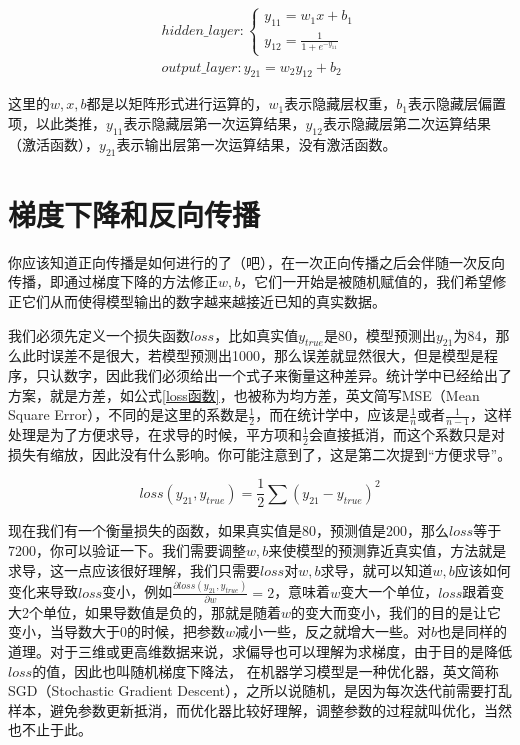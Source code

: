 \documentclass[a5paper, 11pt, openany]{book}
\begin{document}
\begin{equation}\label{forward}
    \begin{aligned}
        hidden\_layer: 
        \begin{cases}
            y_{11} = w_1x+b_1 \\
            y_{12} = \frac{1}{1+e^{-y_{11}}}
        \end{cases}\\
        output\_layer:
            y_{21} = w_2y_{12} + b_2
    \end{aligned}
\end{equation}

这里的$w, x, b$都是以矩阵形式进行运算的，$w_1$表示隐藏层权重，$b_1$表示隐藏层偏置项，以此类推，$y_{11}$表示隐藏层第一次运算结果，$y_{12}$表示隐藏层第二次运算结果（激活函数），$y_{21}$表示输出层第一次运算结果，没有激活函数。

\section{梯度下降和反向传播}

你应该知道正向传播是如何进行的了（吧），在一次正向传播之后会伴随一次反向传播，即通过梯度下降的方法修正$w, b$，它们一开始是被随机赋值的，我们希望修正它们从而使得模型输出的数字越来越接近已知的真实数据。

我们必须先定义一个损失函数$loss$，比如真实值$y_{true}$是80，模型预测出$y_{21}$为84，那么此时误差不是很大，若模型预测出1000，那么误差就显然很大，但是模型是程序，只认数字，因此我们必须给出一个式子来衡量这种差异。统计学中已经给出了方案，就是方差，如公式\ref{loss函数}，也被称为均方差，英文简写MSE（Mean Square Error），不同的是这里的系数是$\frac{1}{2}$，而在统计学中，应该是$\frac{1}{n}$或者$\frac{1}{n-1}$，这样处理是为了方便求导，在求导的时候，平方项和$\frac{1}{2}$会直接抵消，而这个系数只是对损失有缩放，因此没有什么影响。你可能注意到了，这是第二次提到“方便求导”。

\begin{equation}\label{loss函数}
    loss(y_{21}, y_{true}) = \frac{1}{2}\sum(y_{21} - y_{true})^2
\end{equation}

现在我们有一个衡量损失的函数，如果真实值是80，预测值是200，那么$loss$等于7200，你可以验证一下。我们需要调整$w, b$来使模型的预测靠近真实值，方法就是求导，这一点应该很好理解，我们只需要$loss$对$w, b$求导，就可以知道$w, b$应该如何变化来导致$loss$变小，例如$\frac{\partial{loss(y_{21}, y_{true})}}{\partial{w}}=2$，意味着$w$变大一个单位，$loss$跟着变大2个单位，如果导数值是负的，那就是随着$w$的变大而变小，我们的目的是让它变小，当导数大于0的时候，把参数$w$减小一些，反之就增大一些。对$b$也是同样的道理。对于三维或更高维数据来说，求偏导也可以理解为求梯度，由于目的是降低$loss$的值，因此也叫随机梯度下降法， 在机器学习模型是一种优化器，英文简称SGD（Stochastic Gradient Descent），之所以说随机，是因为每次迭代前需要打乱样本，避免参数更新抵消，而优化器比较好理解，调整参数的过程就叫优化，当然也不止于此。
\end{document}
